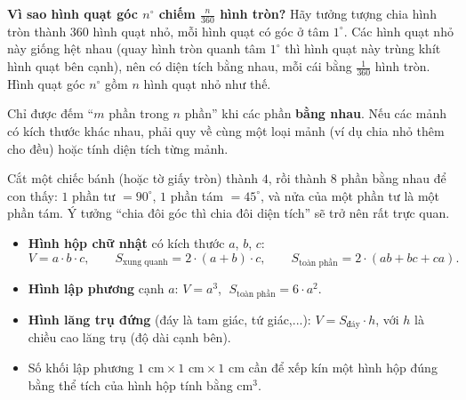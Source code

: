 \begin{proofbox}
\textbf{Vì sao hình quạt góc $n^\circ$ chiếm $\frac{n}{360}$ hình tròn?} Hãy tưởng tượng chia hình tròn thành $360$ hình quạt nhỏ, mỗi hình quạt có góc ở tâm $1^\circ$. Các hình quạt nhỏ này giống hệt nhau (quay hình tròn quanh tâm $1^\circ$ thì hình quạt này trùng khít hình quạt bên cạnh), nên có diện tích bằng nhau, mỗi cái bằng $\frac{1}{360}$ hình tròn. Hình quạt góc $n^\circ$ gồm $n$ hình quạt nhỏ như thế.
\end{proofbox}

\begin{warnbox}
Chỉ được đếm ``$m$ phần trong $n$ phần'' khi các phần \textbf{bằng nhau}. Nếu các mảnh có kích thước khác nhau, phải quy về cùng một loại mảnh (ví dụ chia nhỏ thêm cho đều) hoặc tính diện tích từng mảnh.
\end{warnbox}

\begin{parentbox}
Cắt một chiếc bánh (hoặc tờ giấy tròn) thành $4$, rồi thành $8$ phần bằng nhau để con thấy: $1$ phần tư $=90^\circ$, $1$ phần tám $=45^\circ$, và nửa của một phần tư là một phần tám. Ý tưởng ``chia đôi góc thì chia đôi diện tích'' sẽ trở nên rất trực quan.
\end{parentbox}

\begin{knowbox}
\begin{itemize}[leftmargin=1.3em,itemsep=2pt,topsep=2pt]
  \item \textbf{Hình hộp chữ nhật} có kích thước $a$, $b$, $c$:
  \[ V=a\cdot b\cdot c,\qquad S_{\text{xung quanh}}=2\cdot(a+b)\cdot c,\qquad S_{\text{toàn phần}}=2\cdot(ab+bc+ca). \]
  \item \textbf{Hình lập phương} cạnh $a$: $V=a^3$, $\;S_{\text{toàn phần}}=6\cdot a^2$.
  \item \textbf{Hình lăng trụ đứng} (đáy là tam giác, tứ giác,...): $V=S_{\text{đáy}}\cdot h$, với $h$ là chiều cao lăng trụ (độ dài cạnh bên).
  \item Số khối lập phương $1\text{ cm}\times1\text{ cm}\times1\text{ cm}$ cần để xếp kín một hình hộp đúng bằng thể tích của hình hộp tính bằng $\text{cm}^3$.
\end{itemize}
\end{knowbox}

